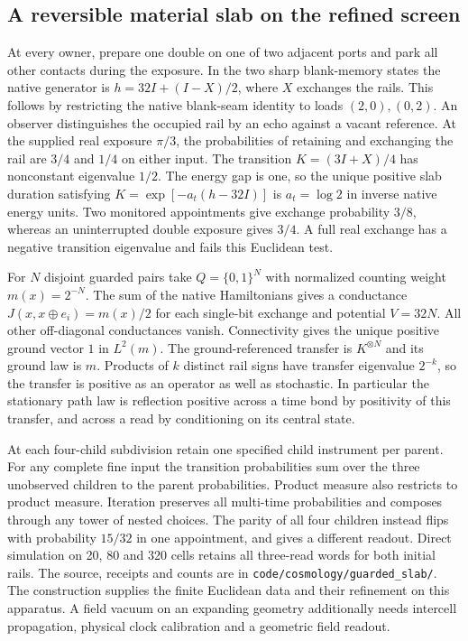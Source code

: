 \documentclass[11pt]{article}
\theoremstyle{remark}
\theoremstyle{plain}
\begin{document}
\subsection{A reversible material slab on the refined screen}

At every owner, prepare one double on one of two adjacent ports and park
all other contacts during the exposure. In the two sharp blank-memory
states the native generator is
\(h=32I+(I-X)/2\), where \(X\) exchanges the rails. This follows by
restricting the native blank-seam identity to loads \((2,0),(0,2)\).
An observer distinguishes the occupied rail by an echo against a vacant
reference. At the supplied real exposure \(\pi/3\), the probabilities of
retaining and exchanging the rail are \(3/4\) and \(1/4\) on either input.
The transition \(K=(3I+X)/4\) has nonconstant eigenvalue \(1/2\).
The energy gap is one, so the unique positive slab duration satisfying
\(K=\exp[-a_t(h-32I)]\) is \(a_t=\log 2\) in inverse native energy units.
Two monitored appointments give exchange probability \(3/8\), whereas an
uninterrupted double exposure gives \(3/4\). A full real exchange has a
negative transition eigenvalue and fails this Euclidean test.

For \(N\) disjoint guarded pairs take \(Q=\{0,1\}^N\) with normalized
counting weight \(m(x)=2^{-N}\). The sum of the native Hamiltonians gives a
conductance \(J(x,x\oplus e_i)=m(x)/2\) for each single-bit exchange and
potential \(V=32N\). All other off-diagonal conductances vanish.
Connectivity gives the unique positive ground vector \(1\) in \(L^2(m)\).
The ground-referenced transfer is \(K^{\otimes N}\) and its ground law is
\(m\). Products of \(k\) distinct rail signs have transfer eigenvalue
\(2^{-k}\), so the transfer is positive as an operator as well as stochastic.
In particular the stationary path law is reflection positive across a time
bond by positivity of this transfer, and across a read by conditioning on
its central state.

At each four-child subdivision retain one specified child instrument per
parent. For any complete fine input the transition probabilities sum over
the three unobserved children to the parent probabilities. Product measure
also restricts to product measure. Iteration preserves all multi-time
probabilities and composes through any tower of nested choices. The
parity of all four children instead flips with probability \(15/32\) in
one appointment, and gives a different readout. Direct simulation on 20,
80 and 320 cells retains all three-read words for both initial rails.
The source, receipts and counts are in
\nolinkurl{code/cosmology/guarded_slab/}. The construction supplies the
finite Euclidean data and their refinement on this apparatus. A field
vacuum on an expanding geometry additionally needs intercell propagation,
physical clock calibration and a geometric field readout.
\end{document}
